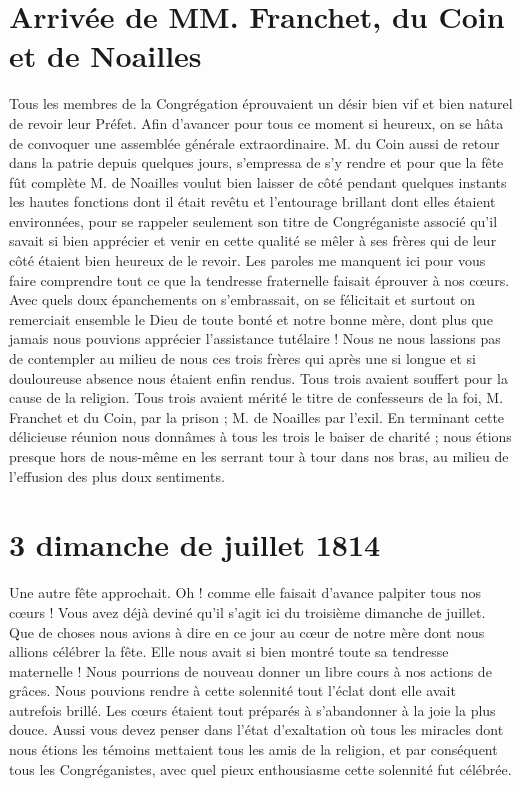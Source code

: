 \section*{Arrivée de MM. Franchet, du Coin et de Noailles}
Tous les membres de la Congrégation éprouvaient un désir bien vif et bien naturel de revoir leur Préfet. Afin d'avancer pour tous ce moment si heureux, on se hâta de convoquer une assemblée générale extraordinaire. M. du Coin aussi de retour dans la patrie depuis quelques jours, s'empressa de s'y rendre et pour que la fête fût complète M. de Noailles voulut bien laisser de côté pendant quelques instants les hautes fonctions dont il était revêtu et l'entourage brillant dont elles étaient environnées, pour se rappeler seulement son titre de Congréganiste associé qu'il savait si bien apprécier et venir en cette qualité se mêler à ses frères qui de leur côté étaient bien heureux de le revoir. Les paroles me manquent ici pour vous faire comprendre tout ce que la tendresse fraternelle faisait éprouver à nos cœurs. Avec quels doux épanchements on s'embrassait, on se félicitait et surtout on remerciait ensemble le Dieu de toute bonté et notre bonne mère, dont plus que jamais nous pouvions apprécier l'assistance tutélaire ! Nous ne nous lassions pas de contempler au milieu de nous ces trois frères qui après
une si longue et si douloureuse absence nous étaient enfin rendus. Tous trois avaient souffert pour la cause de la religion. Tous trois avaient mérité le titre de confesseurs de la foi, M. Franchet et du Coin, par la prison ; M. de Noailles par l'exil. En terminant cette délicieuse réunion nous donnâmes à tous les trois le baiser de charité ; nous étions presque hors de nous-même en les serrant tour à tour dans nos bras, au milieu de l'effusion des plus doux sentiments.

\section*{3 dimanche de juillet 1814}
Une autre fête approchait. Oh ! comme elle faisait d'avance palpiter tous nos cœurs ! Vous avez déjà deviné qu'il s'agit ici du troisième dimanche de juillet. Que de choses nous avions à dire en ce jour au cœur de notre mère dont nous allions célébrer la fête. Elle nous avait si bien montré toute sa tendresse maternelle ! Nous pourrions de nouveau donner un libre cours à nos actions de grâces. Nous pouvions rendre à cette solennité tout l'éclat dont elle avait autrefois brillé. Les cœurs étaient tout préparés à s'abandonner à la joie la plus douce. Aussi vous devez penser dans l'état d'exaltation où tous les miracles dont nous étions les témoins mettaient tous les amis de la religion, et par conséquent tous les Congréganistes, avec quel pieux enthousiasme cette solennité fut célébrée.

